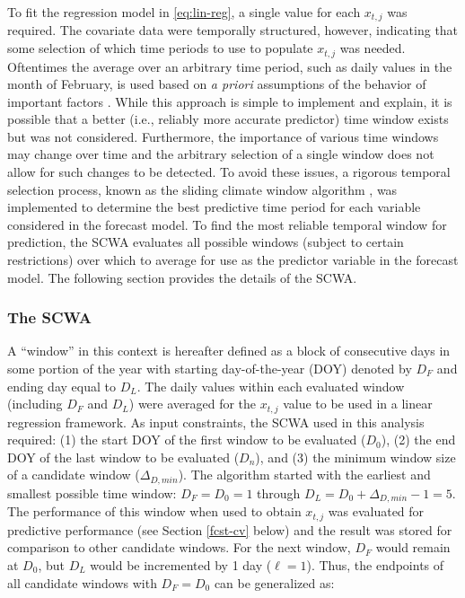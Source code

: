 \documentclass[12pt,]{book}
\theoremstyle{definition}
\theoremstyle{definition}
\theoremstyle{definition}
\theoremstyle{remark}
\begin{document}
\noindent
To fit the regression model in \eqref{eq:lin-reg}, a single value for each
\(x_{t,j}\) was required. The covariate data were temporally structured,
however, indicating that some selection of which time periods to use to
populate \(x_{t,j}\) was needed. Oftentimes the average over an
arbitrary time period, such as daily values in the month of February, is
used based on \emph{a priori} assumptions of the behavior of important
factors \citep{vandepol-etal-2016}. While this approach is simple to
implement and explain, it is possible that a better (i.e., reliably more
accurate predictor) time window exists but was not considered.
Furthermore, the importance of various time windows may change over time
and the arbitrary selection of a single window does not allow for such
changes to be detected. To avoid these issues, a rigorous temporal
selection process, known as the sliding climate window algorithm
\citep[SCWA;][]{vandepol-etal-2016}, was implemented to determine the
best predictive time period for each variable considered in the forecast
model. To find the most reliable temporal window for prediction, the
SCWA evaluates all possible windows (subject to certain restrictions)
over which to average for use as the predictor variable in the forecast
model. The following section provides the details of the SCWA.

\subsubsection{The SCWA}\label{the-scwa}

\noindent
A ``window'' in this context is hereafter defined as a block of
consecutive days in some portion of the year with starting
day-of-the-year (DOY) denoted by \(D_F\) and ending day equal to
\(D_L\). The daily values within each evaluated window (including
\(D_F\) and \(D_L\)) were averaged for the \(x_{t,j}\) value to be used
in a linear regression framework. As input constraints, the SCWA used in
this analysis required: (1) the start DOY of the first window to be
evaluated (\(D_0\)), (2) the end DOY of the last window to be evaluated
(\(D_n\)), and (3) the minimum window size of a candidate window
(\(\Delta_{D,min}\)). The algorithm started with the earliest and
smallest possible time window: \(D_F = D_0 = 1\) through
\(D_L = D_0 + \Delta_{D,min} - 1 = 5\). The performance of this window
when used to obtain \(x_{t,j}\) was evaluated for predictive performance
(see Section \ref{fcst-cv} below) and the result was stored for
comparison to other candidate windows. For the next window, \(D_F\)
would remain at \(D_0\), but \(D_L\) would be incremented by 1 day
(\(\ell=1\)). Thus, the endpoints of all candidate windows with
\(D_F = D_0\) can be generalized as:
\end{document}

